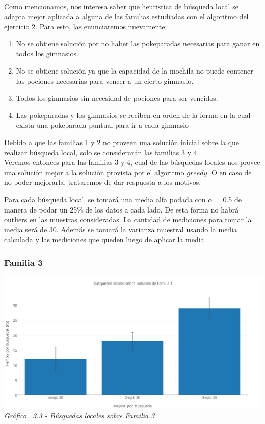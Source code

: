 Como mencionamos, nos interesa saber que heuristica de búsqueda local se adapta mejor aplicada a alguna de las familias estudiadas con el algoritmo del ejercicio 2. Para esto, las enunciaremos nuevamente:

\begin{enumerate}
\item No se obtiene soluci\'on por no haber las pokeparadas necesarias para ganar en todos los gimnasios.
\item No se obtiene soluci\'on ya que la capacidad de la mochila no puede contener las pociones necesarias para vencer a un cierto gimnasio.
\item Todos los gimnasios sin necesidad de pociones para ser vencidos.
\item Las pokeparadas y los gimnasios se reciben en orden de la forma en la cual exista una pokeparada puntual para ir a cada gimnasio
\end{enumerate}

Debido a que las familias 1 y 2 no proveen una solución inicial sobre la que realizar búsqueda local, solo se considerarán las familias 3 y 4.\\
Veremos entonces para las familias 3 y 4, cual de las búsquedas locales nos provee una solución mejor a la solución provista por el algoritmo $greedy$. O en caso de no poder mejorarla, trataremos de dar respuesta a los motivos.

Para cada búsqueda local, se tomará una media alfa podada con $\alpha$ = 0.5 de manera de podar un 25\% de los datos a cada lado. De esta forma no habrá outliers en las muestras consideradas. 
La cantidad de mediciones para tomar la media será de 30. Además se tomará la varianza muestral usando la media calculada y las mediciones que queden luego de aplicar la media.\\

\subsubsection*{Familia 3}

\vspace*{0.3cm} \vspace*{0.3cm}
  \begin{center}
 \includegraphics[scale=0.5]{./EJ3/local_search_familia.png}
 {            \textit{Gráfico \ 3.3 - Búsquedas locales sobre Familia 3}}
  \end{center}
  \vspace*{0.3cm}

